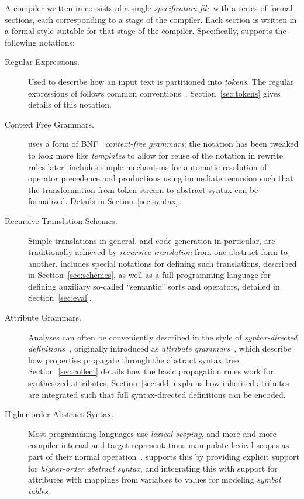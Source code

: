 \documentclass[11pt]{article} %
\begin{document}
A compiler written in \HAX consists of a single \emph{specification file} with a series of formal
sections, each corresponding to a stage of the compiler.  Each section is written in a formal style
suitable for that stage of the compiler. Specifically, \HAX supports the following notations:
\begin{description}

\item[Regular Expressions.] Used to describe how an input text is partitioned into
  \emph{tokens}. The regular expressions of \HAX follows common
  conventions~\cite{Aho+:2006}. Section~\ref{sec:tokens} gives details of this notation.

\item[Context Free Grammars.] \HAX uses a form of BNF~\cite{NaurEtal:cacm1960} \emph{context-free
    grammars}; the notation has been tweaked to look more like \emph{templates} to allow for reuse
  of the notation in rewrite rules later. \HAX includes simple mechanisms for automatic resolution
  of operator precedence and productions using immediate recursion such that the transformation from
  token stream to abstract syntax can be formalized. Details in Section~\ref{sec:syntax}.

\item[Recursive Translation Schemes.] Simple translations in general, and code generation in
  particular, are traditionally achieved by \emph{recursive translation} from one abstract form to
  another.  \HAX includes special notations for defining such translations, described in
  Section~\ref{sec:schemes}, as well as a full programming language for defining auxiliary so-called
  ``semantic'' sorts and operators, detailed in Section~\ref{sec:eval}.

\item[Attribute Grammars.] Analyses can often be conveniently described in the style of
  \emph{syntax-directed definitions}~\cite{Aho+:2006}, originally introduced as \emph{attribute
    grammars}~\cite{Knuth:mst1968}, which describe how properties propagate through the abstract
  syntax tree.  Section~\ref{sec:collect} details how the basic propagation rules work for
  synthesized attributes, Section~\ref{sec:sdd} explains how inherited atributes are integrated such
  that full syntax-directed definitions can be encoded.

\item[Higher-order Abstract Syntax.] Most programming languages use \emph{lexical scoping}, and more
  and more compiler internal and target representations manipulate lexical scopes as part of their
  normal operation~\cite{MarlowPeyton-Jones:2010,Morrisett+:popl1998}. \HAX supports this by
  providing explicit support for \emph{higher-order abstract syntax}, and integrating this with
  support for attributes with mappings from variables to values for modeling \emph{symbol tables}.

\end{description}
\end{document}
